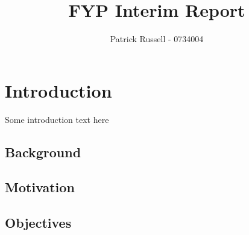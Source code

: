 \documentclass{article}
\title{FYP Interim Report}
\author{Patrick Russell - 0734004}
\date{}
\begin{document}
\maketitle
\tableofcontents
\newpage
\section{Introduction}
Some introduction text here
\label{sec:Background}
\subsection{Background}
\label{sec:Subsection}
\subsection{Motivation}
\label{sec:Motivation}
\subsection{Objectives}
\label{sec:Objectives}
\end{document}
